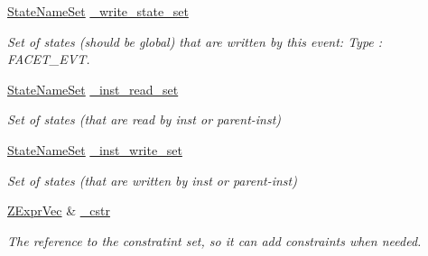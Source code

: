 \begin{DoxyCompactItemize}
\mbox{\label{classilang_1_1_trace_step_a0175ed8ddef80e471209f784924cd64a}} 
\mbox{\hyperlink{classilang_1_1_trace_step_a784c4a30b16707ec6a2ed6e96e268c86}{State\+Name\+Set}} \mbox{\hyperlink{classilang_1_1_trace_step_a0175ed8ddef80e471209f784924cd64a}{\+\_\+write\+\_\+state\+\_\+set}}
\begin{DoxyCompactList}\small\item\em Set of states (should be global) that are written by this event\+: Type \+: F\+A\+C\+E\+T\+\_\+\+E\+VT. \end{DoxyCompactList}\item 
\mbox{\label{classilang_1_1_trace_step_a41a27793bf36f8df75c59b15c00155c2}} 
\mbox{\hyperlink{classilang_1_1_trace_step_a784c4a30b16707ec6a2ed6e96e268c86}{State\+Name\+Set}} \mbox{\hyperlink{classilang_1_1_trace_step_a41a27793bf36f8df75c59b15c00155c2}{\+\_\+inst\+\_\+read\+\_\+set}}
\begin{DoxyCompactList}\small\item\em Set of states (that are read by inst or parent-\/inst) \end{DoxyCompactList}\item 
\mbox{\label{classilang_1_1_trace_step_aca61ea02b831fc575165cf3f35cd1f88}} 
\mbox{\hyperlink{classilang_1_1_trace_step_a784c4a30b16707ec6a2ed6e96e268c86}{State\+Name\+Set}} \mbox{\hyperlink{classilang_1_1_trace_step_aca61ea02b831fc575165cf3f35cd1f88}{\+\_\+inst\+\_\+write\+\_\+set}}
\begin{DoxyCompactList}\small\item\em Set of states (that are written by inst or parent-\/inst) \end{DoxyCompactList}\item 
\mbox{\label{classilang_1_1_trace_step_a8fe0e811994ac404328a2f5ca7c15921}} 
\mbox{\hyperlink{classilang_1_1_trace_step_a19a387426712dbec11dcecf170fb7e1a}{Z\+Expr\+Vec}} \& \mbox{\hyperlink{classilang_1_1_trace_step_a8fe0e811994ac404328a2f5ca7c15921}{\+\_\+cstr}}
\begin{DoxyCompactList}\small\item\em The reference to the constratint set, so it can add constraints when needed. \end{DoxyCompactList}\item 

\end{DoxyCompactItemize}
